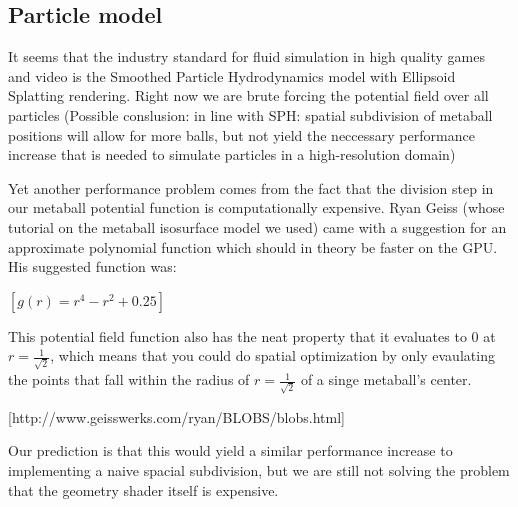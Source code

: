 \documentclass{article}
\begin{document}
        \subsection{Particle model}
    	It seems that the industry standard for fluid simulation in high quality games and video is the Smoothed Particle Hydrodynamics model with Ellipsoid Splatting rendering.
        Right now we are brute forcing the potential field over all particles
        (Possible conslusion: in line with SPH: spatial subdivision of metaball positions will allow for more balls, but not yield the neccessary performance increase that is needed to simulate particles in a high-resolution domain)

        Yet another performance problem comes from the fact that the division step in our metaball potential function is computationally expensive.
        Ryan Geiss (whose tutorial on the metaball isosurface model we used) came with a suggestion for an approximate polynomial function which should in theory be faster on the GPU. His suggested function was:

        $[g(r) = r^4 - r^2 + 0.25]$

        This potential field function also has the neat property that it evaluates to 0 at $r=\frac{1}{\sqrt{2}}$, which means that you could do spatial optimization by only evaulating the points that fall within the radius of $r=\frac{1}{\sqrt{2}}$ of a singe metaball's center.

        [http://www.geisswerks.com/ryan/BLOBS/blobs.html]

        Our prediction is that this would yield a similar performance increase to implementing a naive spacial subdivision, but we are still not solving the problem that the geometry shader itself is expensive.
\end{document}

